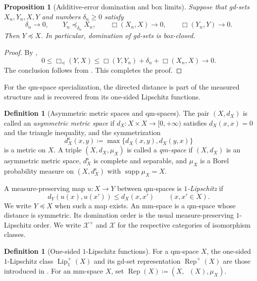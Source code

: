 \documentclass{amsart}
\theoremstyle{plain}
\newtheorem{proposition}[theorem]{Proposition}
\theoremstyle{definition}
\newtheorem{definition}[theorem]{Definition}
\theoremstyle{remark}
\newcommand{\X}{\mathcal{X}}
\newcommand{\Xp}{\mathcal{X}^{+}}
\newcommand{\lipplus}{\operatorname{Lip}^{+}_{1}}
\DeclareMathOperator{\lipone}{Lip_1}
\DeclareMathOperator{\supp}{supp}
\begin{document}
\begin{proposition}[Additive-error domination and box limits]
\label{prop:additive-domination-box-closedness}
Suppose that gd-sets $X_n,Y_n,X,Y$ and numbers $\delta_n\geq0$ satisfy
\[
\delta_n\longrightarrow0,\qquad Y_n\preceq_{\delta_n}X_n,\qquad
\Box(X_n,X)\longrightarrow0,\qquad\Box(Y_n,Y)\longrightarrow0.
\]
Then $Y\preceq X$.  In particular, domination of gd-sets is box-closed.
\end{proposition}

\begin{proof}
By ,
\[ 0\leq\Box_{\preceq}(Y,X) \leq\Box(Y,Y_n)+\delta_n+\Box(X_n,X)\longrightarrow0. \]
The conclusion follows from .
	This completes the proof.
\end{proof}

For the qm-space specialization, the directed distance is part of the
measured structure and is recovered from its one-sided Lipschitz functions.

\begin{definition}[Asymmetric metric spaces and qm-spaces]
\label{def:asymmetric-mm-space}
The pair $(X,d_X)$ is called an \emph{asymmetric metric space} if
$d_X\colon X\times X\to[0,+\infty)$ satisfies $d_X(x,x)=0$ and the triangle
inequality, and the symmetrization
\[
d_X^{\mathrm s}(x,y)\coloneqq\max\{d_X(x,y),d_X(y,x)\}
\]
is a metric on $X$.  A triple $(X,d_X,\mu_X)$ is called a \emph{qm-space}
if $(X,d_X)$ is an asymmetric metric space, $d_X^{\mathrm s}$ is complete
and separable, and $\mu_X$ is a Borel probability measure on
$(X,d_X^{\mathrm s})$ with $\supp\mu_X=X$.
\end{definition}

A measure-preserving map $u\colon X\to Y$ between qm-spaces is
\emph{$1$-Lipschitz} if
\[
d_Y(u(x),u(x'))\leq d_X(x,x')\qquad(x,x'\in X).
\]
We write $Y\preceq X$ when such a map exists.  An mm-space is a qm-space
whose distance is symmetric.  Its domination order is the usual
measure-preserving $1$-Lipschitz order.  We write $\Xp$ and $\X$ for the
respective categories of isomorphism classes.

\begin{definition}[One-sided $1$-Lipschitz functions]
\label{def:lipplus}
For a qm-space $X$, the one-sided $1$-Lipschitz class $\lipplus(X)$ and its
gd-set representation $\operatorname{Rep}^{+}(X)$ are those introduced in
.  For an mm-space $X$, set
$\operatorname{Rep}(X)\coloneqq(X,\lipone(X),\mu_X)$.
\end{definition}
\end{document}
